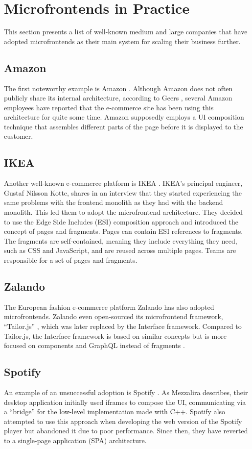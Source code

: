 \section{Microfrontends in Practice}
This section presents a list of well-known medium and large companies that have adopted microfrontends as their main system for scaling their business further.

\subsection*{Amazon}
The first noteworthy example is Amazon \cite{Amazon}. Although Amazon does not often publicly share its internal architecture, according to Geers \cite{Geers}, several Amazon employees have reported that the e-commerce site has been using this architecture for quite some time. Amazon supposedly employs a UI composition technique that assembles different parts of the page before it is displayed to the customer.

\subsection*{IKEA}
Another well-known e-commerce platform is IKEA \cite{IKEA}. IKEA's principal engineer, Gustaf Nilsson Kotte, shares in an interview \cite{StenbergIkea} that they started experiencing the same problems with the frontend monolith as they had with the backend monolith. This led them to adopt the microfrontend architecture. They decided to use the Edge Side Includes (ESI) composition approach and introduced the concept of pages and fragments. Pages can contain ESI references to fragments. The fragments are self-contained, meaning they include everything they need, such as CSS and JavaScript, and are reused across multiple pages. Teams are responsible for a set of pages and fragments.

\subsection*{Zalando}
The European fashion e-commerce platform Zalando \cite{Zalando} has also adopted microfrontends. Zalando even open-sourced its microfrontend framework, ``Tailor.js'' \cite{TailorJs}, which was later replaced by the Interface framework. Compared to Tailor.js, the Interface framework is based on similar concepts but is more focused on components and GraphQL instead of fragments \cite{MezzaliraBuildingMf}.

\subsection*{Spotify}
An example of an unsuccessful adoption is Spotify \cite{Spotify}. As Mezzalira \cite{MezzaliraBuildingMf} describes, their desktop application initially used iframes to compose the UI, communicating via a ``bridge'' for the low-level implementation made with C++. Spotify also attempted to use this approach when developing the web version of the Spotify player but abandoned it due to poor performance. Since then, they have reverted to a single-page application (SPA) architecture.

